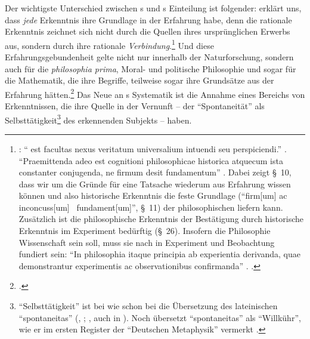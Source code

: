 Der wichtigste Unterschied zwischen s und
s Einteilung ist folgender:
 erklärt uns, dass \emph{jede} Erkenntnis ihre Grundlage
in der Erfahrung habe, denn die rationale Erkenntnis zeichnet sich nicht durch
die Quellen ihres ursprünglichen Erwerbs aus, sondern durch ihre rationale
\emph{Verbindung}.\footnote{\cite[Vgl.][\S~483]{Wolff:Psychologiaempirica1968}:
\enquote{ est facultas nexus veritatum universalium intuendi seu
perspiciendi.} \cite[Außerdem][\S\S~10\,f., 26,
34]{Wolff:Discursuspraeliminarisdephilosophiaingenere1996}.
\enquote{Praemittenda adeo est cognitioni philosophicae historica atquecum ista
constanter conjugenda, ne firmum desit fundamentum}
\parencite[][\S~11]{Wolff:Discursuspraeliminarisdephilosophiaingenere1996}.
Dabei zeigt \S~10, dass wir um die Gründe für eine Tatsache wiederum aus
Erfahrung wissen können und also historische Erkenntnis die feste Grundlage
(\enquote{firm[um] ac inconcuss[um] \punkt\ fundament[um]}, \S~11) der
philosophischen liefern kann. Zusätzlich ist die philosophische Erkenntnis der
Bestätigung durch historische Erkenntnis im Experiment bedürftig (\S~26).
Insofern die Philosophie Wissenschaft sein soll, muss sie nach  in
Experiment und Beobachtung fundiert sein: \enquote{In philosophia itaque
principia ab experientia derivanda, quae demonstrantur experimentis ac
observationibus confirmanda}
\parencite[][\S~34]{Wolff:Discursuspraeliminarisdephilosophiaingenere1996}.
\cite[Siehe
auch][\pno~44\,f.]{Schneiders:VernunftundVerstand--KriseneinesBegriffspaares1995}.}
Und diese Erfahrungsgebundenheit gelte nicht nur innerhalb der Naturforschung,
sondern auch für die \emph{philosophia prima}, Moral- und politische Philosophie
und sogar für die Mathematik, die ihre Begriffe, teilweise sogar ihre Grundsätze aus der Erfahrung
hätten.\footnote{\cite[Vgl.][\S~12]{Wolff:Discursuspraeliminarisdephilosophiaingenere1996}.}
Das Neue an s Systematik ist die Annahme eines Bereichs von Erkenntnissen, die ihre Quelle in der
Vernunft -- der \enquote{Spontaneität} als
Selbsttätigkeit\footnote{\enquote{Selbsttätigkeit} ist bei 
wie schon bei
 die Übersetzung des lateinischen \enquote{spontaneitas}
\mkbibparens{\cite[vgl.][B~68]{Kant:KritikderreinenVernunft2003}, \cite[][III:
70.22, 70.27, 107.25]{Kant:GesammelteWerke1900ff.};
\cite[][\S~704]{Baumgarten:Metaphysica---Metaphysik2011}, auch in \cite[][XVII:
131.26, 131.33]{Kant:GesammelteWerke1900ff.}}. Noch
 übersetzt \enquote{spontaneitas} als
\enquote{Willkühr}, wie er im ersten Register der \enquote{Deutschen Metaphysik}
vermerkt
\parencite[vgl.][677]{Wolff:VernuenftigeGedankenvondenKraeftendesmenschlichenVerstandesundihremrichtigenGebraucheinErkenntnisderWahrheit1978}.}
des erkennenden Subjekts -- haben.



